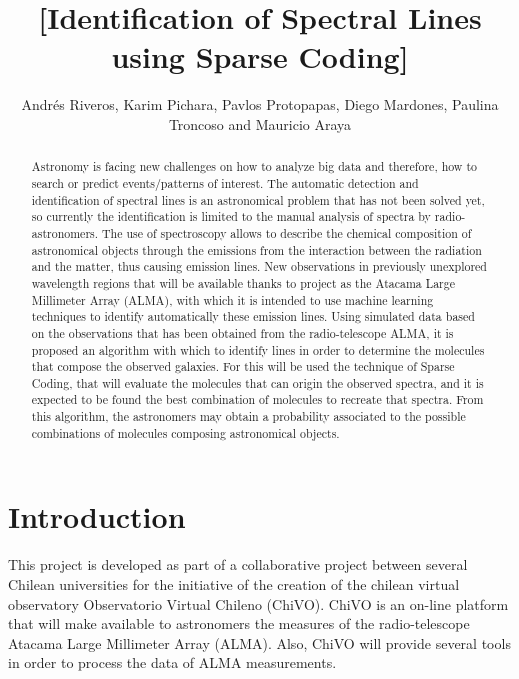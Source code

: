 \documentclass[twocolumn, draft]{emulateapj}
\begin{document}
\title{[Identification of Spectral Lines using Sparse Coding]}
\author{Andr\'es Riveros,
		Karim Pichara,
		Pavlos Protopapas,
		Diego Mardones,
		Paulina Troncoso and
		Mauricio Araya}

\begin{abstract}
Astronomy is facing new challenges on how to analyze big data and therefore, how to search or predict events/patterns of interest. The automatic detection and identification of spectral lines is an astronomical problem that has not been solved yet, so currently the identification is limited to the manual analysis of spectra by radio-astronomers. The use of spectroscopy allows to describe the chemical composition of astronomical objects through the emissions from the interaction between the radiation and the matter, thus causing emission lines. New observations in previously unexplored wavelength regions that will be available thanks to project as the Atacama Large Millimeter Array (ALMA), with which it is intended to use machine learning techniques to identify automatically these emission lines. Using simulated data based on the observations that has been obtained from the radio-telescope ALMA, it is proposed an algorithm with which to identify lines in order to determine the molecules that compose the observed galaxies. For this will be used the technique of Sparse Coding, that will evaluate the molecules that can origin the observed spectra, and it is expected to be found the best combination of molecules to recreate that spectra. From this algorithm, the astronomers may obtain a probability associated to the possible combinations of molecules composing astronomical objects.
\end{abstract}


\section{Introduction}

This project is developed as part of a collaborative project between several Chilean universities
for the initiative of the creation of the chilean virtual observatory Observatorio Virtual Chileno (ChiVO).
ChiVO is an on-line platform that will make available to astronomers the measures of the radio-telescope Atacama
Large Millimeter Array (ALMA). Also, ChiVO will provide several tools in order to process the data of ALMA measurements.
\end{document}
